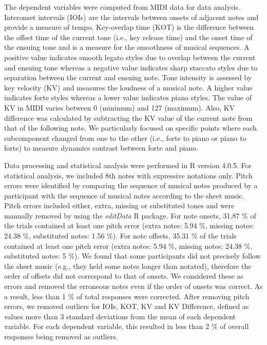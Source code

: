 \documentclass[
  man]{apa6}
\begin{document}
The dependent variables were computed from MIDI data for data analysis. Interonset intervals (IOIs) are the intervals between onsets of adjacent notes and provide a measure of tempo. Key-overlap time (KOT) is the difference between the offset time of the current tone (i.e., key release time) and the onset time of the ensuing tone and is a measure for the smoothness of musical sequences. A positive value indicates smooth legato styles due to overlap between the current and ensuing tone whereas a negative value indicates sharp staccato styles due to separation between the current and ensuing note. Tone intensity is assessed by key velocity (KV) and measures the loudness of a musical note. A higher value indicates forte styles whereas a lower value indicates piano styles. The value of KV in MIDI varies between 0 (minimum) and 127 (maximum). Also, KV difference was calculated by subtracting the KV value of the current note from that of the following note. We particularly focused on specific points where each subcomponent changed from one to the other (i.e., forte to piano or piano to forte) to measure dynamics contrast between forte and piano.

Data processing and statistical analysis were performed in R version 4.0.5. For statistical analysis, we included 8th notes with expressive notations only. Pitch errors were identified by comparing the sequence of musical notes produced by a participant with the sequence of musical notes according to the sheet music. Pitch errors included either, extra, missing or substituted tones and were manually removed by using the \emph{editData} R package. For note onsets, 31.87 \% of the trials contained at least one pitch error (extra notes: 5.94 \%, missing notes: 24.38 \%, substituted notes: 1.56 \%). For note offsets, 35.31 \% of the trials contained at least one pitch error (extra notes: 5.94 \%, missing notes: 24.38 \%, substituted notes: 5 \%). We found that some participants did not precisely follow the sheet music (e.g., they held some notes longer than notated), therefore the order of offsets did not correspond to that of onsets. We considered these as errors and removed the erroneous notes even if the order of onsets was correct. As a result, less than 1 \% of total responses were corrected. After removing pitch errors, we removed outliers for IOIs, KOT, KV and KV Difference, defined as values more than 3 standard deviations from the mean of each dependent variable. For each dependent variable, this resulted in less than 2 \% of overall responses being removed as outliers.
\end{document}
